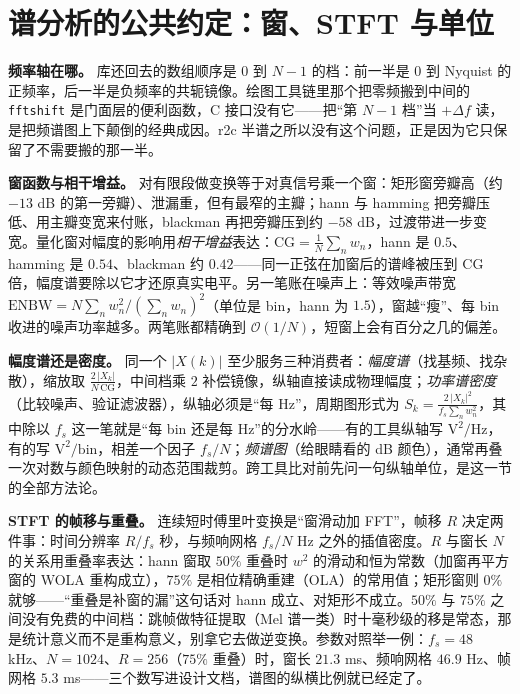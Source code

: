 \documentclass[12pt,a4paper,fontset=fandol]{ctexbook}
\newcommand{\Tp}[1]{\texttt{#1}}
\begin{document}
\section{谱分析的公共约定：窗、STFT 与单位}

\textbf{频率轴在哪。} 库还回去的数组顺序是 $0$ 到 $N-1$ 的档：前一半是 $0$ 到 Nyquist 的正频率，后一半是负频率的共轭镜像。绘图工具链里那个把零频搬到中间的 \Tp{fftshift} 是门面层的便利函数，C 接口没有它——把``第 $N-1$ 档''当 $+\Delta f$ 读，是把频谱图上下颠倒的经典成因。r2c 半谱之所以没有这个问题，正是因为它只保留了不需要搬的那一半。

\textbf{窗函数与相干增益。} 对有限段做变换等于对真信号乘一个窗：矩形窗旁瓣高（约 $-13$ dB 的第一旁瓣）、泄漏重，但有最窄的主瓣；hann 与 hamming 把旁瓣压低、用主瓣变宽来付账，blackman 再把旁瓣压到约 $-58$ dB，过渡带进一步变宽。量化窗对幅度的影响用\emph{相干增益}表达：$\mathrm{CG} = \frac{1}{N}\sum_n w_n$，hann 是 $0.5$、hamming 是 $0.54$、blackman 约 $0.42$——同一正弦在加窗后的谱峰被压到 $\mathrm{CG}$ 倍，幅度谱要除以它才还原真实电平。另一笔账在噪声上：等效噪声带宽 $\mathrm{ENBW} = N\sum_n w_n^2 / (\sum_n w_n)^2$（单位是 bin，hann 为 $1.5$），窗越``瘦''、每 bin 收进的噪声功率越多。两笔账都精确到 $\mathcal{O}(1/N)$，短窗上会有百分之几的偏差。

\textbf{幅度谱还是密度。} 同一个 $\lvert X(k)\rvert$ 至少服务三种消费者：\emph{幅度谱}（找基频、找杂散），缩放取 $\frac{2\,\lvert X_k\rvert}{N\,\mathrm{CG}}$，中间档乘 $2$ 补偿镜像，纵轴直接读成物理幅度；\emph{功率谱密度}（比较噪声、验证滤波器），纵轴必须是``每 Hz''，周期图形式为 $S_k = \frac{2\,\lvert X_k\rvert^2}{f_s \sum_n w_n^2}$，其中除以 $f_s$ 这一笔就是``每 bin 还是每 Hz''的分水岭——有的工具纵轴写 $\mathrm{V^2/Hz}$，有的写 $\mathrm{V^2/bin}$，相差一个因子 $f_s/N$；\emph{频谱图}（给眼睛看的 dB 颜色），通常再叠一次对数与颜色映射的动态范围裁剪。跨工具比对前先问一句纵轴单位，是这一节的全部方法论。

\textbf{STFT 的帧移与重叠。} 连续短时傅里叶变换是``窗滑动加 FFT''，帧移 $R$ 决定两件事：时间分辨率 $R/f_s$ 秒，与频响网格 $f_s/N$ Hz 之外的插值密度。$R$ 与窗长 $N$ 的关系用重叠率表达：hann 窗取 $50\%$ 重叠时 $w^2$ 的滑动和恒为常数（加窗再平方窗的 WOLA 重构成立），$75\%$ 是相位精确重建（OLA）的常用值；矩形窗则 $0\%$ 就够——``重叠是补窗的漏''这句话对 hann 成立、对矩形不成立。$50\%$ 与 $75\%$ 之间没有免费的中间档：跳帧做特征提取（Mel 谱一类）时十毫秒级的移是常态，那是统计意义而不是重构意义，别拿它去做逆变换。参数对照举一例：$f_s = 48$ kHz、$N = 1024$、$R = 256$（$75\%$ 重叠）时，窗长 $21.3$ ms、频响网格 $46.9$ Hz、帧网格 $5.3$ ms——三个数写进设计文档，谱图的纵横比例就已经定了。
\end{document}
